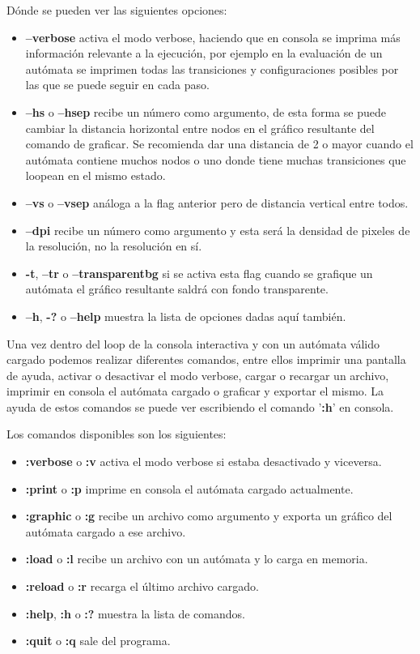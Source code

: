 \documentclass[12pt,a4paper]{article}
\begin{document}
Dónde se pueden ver las siguientes opciones:

\begin{itemize}
  \item \textbf{--verbose} activa el modo verbose, haciendo que en consola se imprima más
  información relevante a la ejecución, por ejemplo en la evaluación de un autómata
  se imprimen todas las transiciones y configuraciones posibles por las que se puede
  seguir en cada paso.
  \item \textbf{--hs} o \textbf{--hsep} recibe un número como argumento, de esta forma se puede cambiar
  la distancia horizontal entre nodos en el gráfico resultante del comando de graficar.
  Se recomienda dar una distancia de 2 o mayor cuando el autómata contiene muchos nodos
  o uno donde tiene muchas transiciones que loopean en el mismo estado.
  \item \textbf{--vs} o \textbf{--vsep} análoga a la flag anterior pero de distancia vertical entre todos.
  \item \textbf{--dpi} recibe un número como argumento y esta será la densidad de pixeles
  de la resolución, no la resolución en sí.
  \item \textbf{-t}, \textbf{--tr} o \textbf{--transparentbg} si se activa esta flag cuando se grafique un
  autómata el gráfico resultante saldrá con fondo transparente.
  \item \textbf{--h}, \textbf{-?} o \textbf{--help} muestra la lista de opciones dadas aquí también.
\end{itemize}

Una vez dentro del loop de la consola interactiva y con un autómata válido cargado 
podemos realizar diferentes comandos, entre ellos imprimir una pantalla de ayuda,
activar o desactivar el modo verbose, cargar o recargar un archivo,
imprimir en consola el autómata cargado o graficar y exportar el mismo. La ayuda
de estos comandos se puede ver escribiendo el comando '\textbf{:h}' en consola.

Los comandos disponibles son los siguientes:

\begin{itemize}
  \item \textbf{:verbose} o \textbf{:v} activa el modo verbose si estaba desactivado y viceversa.
  \item \textbf{:print} o \textbf{:p} imprime en consola el autómata cargado actualmente.
  \item \textbf{:graphic} o \textbf{:g} recibe un archivo como argumento y exporta un gráfico del autómata
  cargado a ese archivo.
  \item \textbf{:load} o \textbf{:l} recibe un archivo con un autómata y lo carga en memoria.
  \item \textbf{:reload} o \textbf{:r} recarga el último archivo cargado.
  \item \textbf{:help}, \textbf{:h} o \textbf{:?} muestra la lista de comandos.
  \item \textbf{:quit} o \textbf{:q} sale del programa.
\end{itemize}
\end{document}
